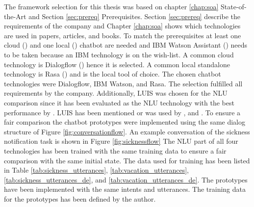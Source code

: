 The framework selection for this thesis was based on chapter \ref{chap:soa} State-of-the-Art 
and Section \ref{sec:prereq} Prerequisites.
Section \ref{sec:prereq} describe the requirements of the company and Chapter \ref{chap:soa} 
shows which technologies are 
used in papers, articles, and books.
To match the prerequisites at least one cloud (\citet{braunEvaluatingNLU, rahman2017programming}) 
and one local (\citet{braunEvaluatingNLU}) chatbot are needed and IBM Watson Assistant (\citet{rahman2017programming, pharmacybot, ieee2018watson, gregori2017evaluation}) needs to be taken because an IBM technology is on the wish-list.
A common cloud technology is Dialogflow (\citet{braunEvaluatingNLU, dutta2017developing, singhbuilding, buiildChatbotsPython, rahman2017programming, ieee2018watson}) hence it is selected.
A common local standalone technology is Rasa (\citet{braunEvaluatingNLU, singhbuilding, rasabocklisch2017, buiildChatbotsPython, gregori2017evaluation}) and is the local tool of choice.
The chosen chatbot technologies were Dialogflow, IBM Watson, and Rasa.
The selection fulfilled all requirements by the company.
Additionally, LUIS\cite{luis2015williams} was chosen for the NLU comparison since it 
has been evaluated as the NLU technology with the best performance by \citet{braunEvaluatingNLU}.
LUIS has been mentioned or was used by \citet{singhbuilding, buiildChatbotsPython, rahman2017programming, dutta2017developing}, 
and \citet{gregori2017evaluation}.
To ensure a fair comparison the chatbot prototypes were implemented using the same 
dialog structure of Figure \ref{fig:conversationflow}.
An example conversation of the sickness notification task is shown in Figure \ref{fig:sicknessflow}
The NLU part of all four technologies has been trained with the same training data to 
ensure a fair comparison with the same initial state.
The data used for training has been listed in
Table \ref{tab:sickness_utterances}, \ref{tab:vacation_utterances}, \ref{tab:sickness_utterances_de}, 
and \ref{tab:vacation_utterances_de}.
The prototypes have been implemented with the same intents and utterances.
The training data for the prototypes has been defined by the author.
